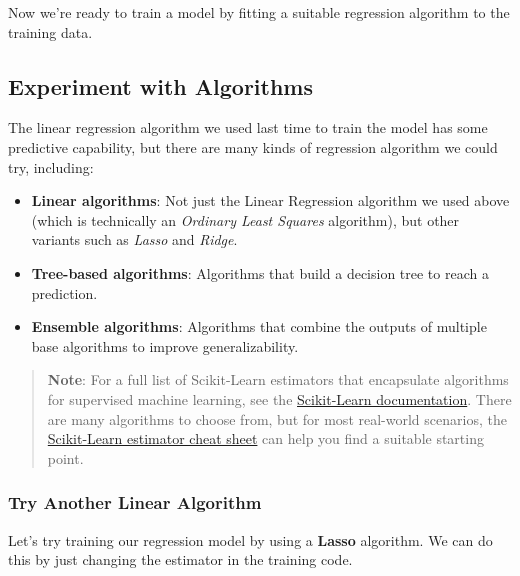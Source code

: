 \documentclass[11pt]{article}
\providecommand{\tightlist}{%
      \setlength{\itemsep}{0pt}\setlength{\parskip}{0pt}}
\begin{document}
Now we're ready to train a model by fitting a suitable regression
algorithm to the training data.

\hypertarget{experiment-with-algorithms}{%
\subsection{Experiment with
Algorithms}\label{experiment-with-algorithms}}

The linear regression algorithm we used last time to train the model has
some predictive capability, but there are many kinds of regression
algorithm we could try, including:

\begin{itemize}
\tightlist
\item
  \textbf{Linear algorithms}: Not just the Linear Regression algorithm
  we used above (which is technically an \emph{Ordinary Least Squares}
  algorithm), but other variants such as \emph{Lasso} and \emph{Ridge}.
\item
  \textbf{Tree-based algorithms}: Algorithms that build a decision tree
  to reach a prediction.
\item
  \textbf{Ensemble algorithms}: Algorithms that combine the outputs of
  multiple base algorithms to improve generalizability.
\end{itemize}

\begin{quote}
\textbf{Note}: For a full list of Scikit-Learn estimators that
encapsulate algorithms for supervised machine learning, see the
\href{https://scikit-learn.org/stable/supervised_learning.html}{Scikit-Learn
documentation}. There are many algorithms to choose from, but for most
real-world scenarios, the
\href{https://scikit-learn.org/stable/tutorial/machine_learning_map/index.html}{Scikit-Learn
estimator cheat sheet} can help you find a suitable starting point.
\end{quote}

\hypertarget{try-another-linear-algorithm}{%
\subsubsection{Try Another Linear
Algorithm}\label{try-another-linear-algorithm}}

Let's try training our regression model by using a \textbf{Lasso}
algorithm. We can do this by just changing the estimator in the training
code.
\end{document}
